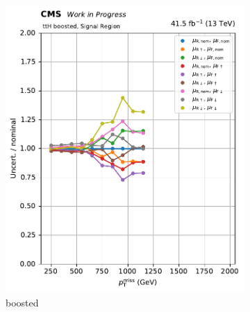 \begin{figure}[htbp]
    \centering
    \begin{subfigure}[b]{0.34\textwidth}
        \includegraphics[width=\textwidth]{figures/ttbar_scale/ratio_vars_SR_ttH_boosted.pdf}
        \caption{\ttH boosted}
    \end{subfigure}
    \hspace{0.05\textwidth}
    \begin{subfigure}[b]{0.34\textwidth}

\end{subfigure}
\end{figure}

